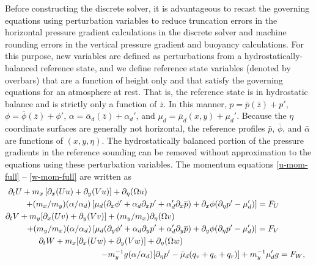 Before constructing the discrete solver, it is advantageous to recast
the governing equations using perturbation variables to reduce
truncation errors in the horizontal pressure gradient calculations in
the discrete solver and machine rounding errors in
the vertical pressure gradient and buoyancy calculations.  
For this purpose, new
variables are defined as perturbations from a hydrostatically-balanced 
reference state, and we define reference state
variables (denoted by overbars) that are a function of height only and
that satisfy the governing equations for an atmosphere at rest.  That is,
the reference state is in hydrostatic balance and is strictly only a
function of $\bar z$.  In this manner, $p=\bar p(\bar z)+p'$, $\phi=\bar
\phi(\bar z)
+\phi'$, $\alpha=\bar \alpha_d(\bar z) +\alpha_d'$, and $\mu_d = \bar\mu_d(x,y) +
\mu_d'$. Because the $\eta$ coordinate surfaces are generally not
horizontal, the reference profiles $\bar p$, $\bar\phi$, and
$\bar\alpha$ are functions of $(x,y,\eta)$. 
The hydrostatically balanced portion of the pressure gradients in the
reference sounding can be removed without approximation to the equations
using these perturbation variables.
The momentum equations 
\eqref{u-mom-full} -- \eqref{w-mom-full} are written as
%
\begin{align}
\partial_t U + m_x\left[\partial_x(Uu) + \partial_y(Vu)\right] + \partial_\eta (\Omega u) ~~~~~~~~ ~~~~~~~~ ~~~~~~~~ ~~~~~~~~ ~~~~~~~ ~~~~~~~ ~~ \notag &
\hphantom{(m_y/m_x)}
\\
+(m_x/m_y) (\alpha/\alpha_d) \left[ \mu_d (\partial_x \phi' + \alpha_d \partial_x p' + \alpha'_d \partial_x \overline{p}) +
\partial_x \phi (\partial_\eta p' - \mu'_d)\right]  = F_U
\label{u-mom-pert}
\\
%
\partial_t V + m_y[\partial_x (Uv) + \partial_y (Vv)] + (m_y/m_x) \partial_\eta (\Omega v) ~~~~~~~~ ~~~~~~~~ ~~~~~~~~ ~~~~~~~~ ~~~~~~ \notag &
\\
+(m_y/m_x) (\alpha/\alpha_d) \left[ \mu_d (\partial_y \phi' + \alpha_d \partial_y p' + \alpha'_d \partial_y \overline{p}) +
\partial_y \phi (\partial_\eta p' - \mu'_d)\right]  = F_V
\\
%
\partial_t W  + m_x [\partial_x (Uw) + \partial_y (Vw)] + \partial_\eta
(\Omega w)  ~~~~~~~~ ~~~~~~~~ ~~~~~~~~ ~~~~~~~~ ~~~ \notag & 
\\
- m_y^{-1} g (\alpha/\alpha_d) [\partial_\eta p' 
- {\bar{\mu}}_d (q_v + q_c +q_r)]
+ m_y^{-1} {\mu}_d'g
&= F_W,
\label{w-mom-pert}
\end{align}
